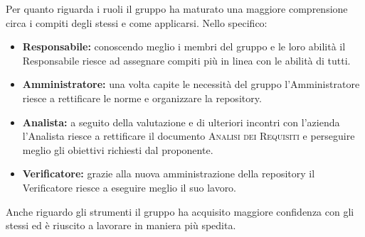\documentclass[../piano_di_qualifica.tex]{subfiles}
\begin{document}
Per quanto riguarda i ruoli il gruppo ha maturato una maggiore comprensione circa i compiti degli stessi e come applicarsi. Nello specifico: 
\begin{itemize}
	\item \textbf{Responsabile:} conoscendo meglio i membri del gruppo e le loro abilità il Responsabile riesce ad assegnare compiti più in linea con le abilità di tutti.
	\item \textbf{Amministratore:} una volta capite le necessità del gruppo l'Amministratore riesce a rettificare le norme e organizzare la repository. 
	\item \textbf{Analista:} a seguito della valutazione e di ulteriori incontri con l'azienda l'Analista riesce a rettificare il documento \textsc{Analisi dei Requisiti} e perseguire meglio gli obiettivi richiesti dal proponente.
	\item \textbf{Verificatore:} grazie alla nuova amministrazione della repository il Verificatore riesce a eseguire meglio il suo lavoro.
\end{itemize}

Anche riguardo gli strumenti il gruppo ha acquisito maggiore confidenza con gli stessi ed è riuscito a lavorare in maniera più spedita.
\end{document}
